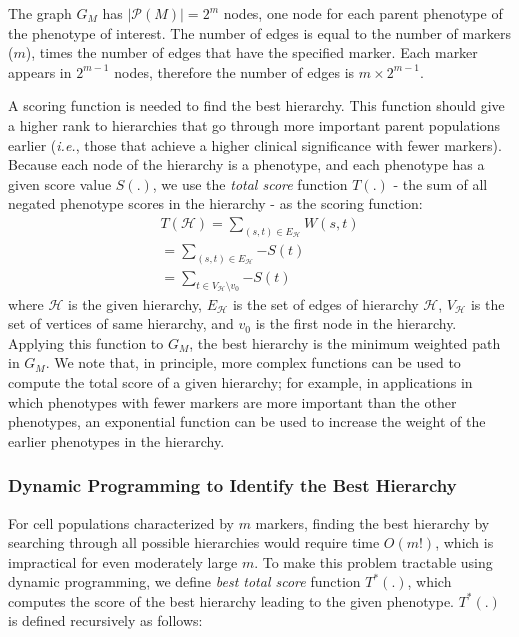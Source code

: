The graph $G_M$ has $|\mathcal{P}(M)|=2^m$ nodes, one node for each parent phenotype of the phenotype of interest. 
The number of edges is equal to the number of markers ($m$), times the number of edges that have the specified marker.  
Each marker appears in $2^{m-1}$ nodes, therefore the number of edges is $m \times 2^{m-1}$. 


A scoring function is needed to find the best hierarchy.  This function should give a higher rank to hierarchies that
go through more important parent populations earlier (\emph{i.e.}, those that achieve a higher clinical significance with fewer
markers).  
Because each node of the hierarchy is a phenotype, and each phenotype has a given score value $S(.)$, we
use the \emph{total score} function $T(.)$ - the sum of all negated phenotype scores in the hierarchy - as the scoring
function:
\begin{equation}
\begin{split}
	T(\mathcal{H}) = \sum_{(s, t) \in E_{\mathcal{H}}}{W(s, t)} \\
	= \sum_{(s, t) \in E_{\mathcal{H}}}{-S(t)} \\
	= \sum_{t \in V_{\mathcal{H}} \setminus v_0}{-S(t)}
\end{split}
\end{equation}
where $\mathcal{H}$ is the given hierarchy, $E_{\mathcal{H}}$ is the set of edges of hierarchy $\mathcal{H}$, $V_{\mathcal{H}}$ is the
set of vertices of same hierarchy, and $v_0$ is the first node in the hierarchy.
Applying this function to $G_M$, the best hierarchy is the minimum weighted path in $G_M$. 
We note that, in principle, more complex functions can be used to compute the total score of a given hierarchy; for
example, in applications in which phenotypes with fewer markers are more important than the other phenotypes, an exponential 
function can be used to increase the weight of the earlier phenotypes in the hierarchy.


\subsubsection{Dynamic Programming to Identify the Best Hierarchy}
For cell populations characterized by $m$ markers, finding the best hierarchy 
by searching through all possible hierarchies would require time $O(m!)$, which is impractical for even moderately large $m$. 
To make this problem tractable using dynamic programming, we define \emph{best total score} function $T^*(.)$, which computes
the score of the best hierarchy leading to the given phenotype. $T^*(.)$ is defined recursively as follows: 

